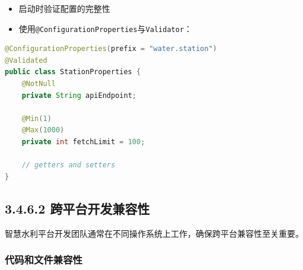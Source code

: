 \begin{enumerate}
  \begin{itemize}
  \tightlist
  \item
    启动时验证配置的完整性
  \item
    使用\passthrough{\lstinline!@ConfigurationProperties!}与\passthrough{\lstinline!Validator!}：
  \end{itemize}

\begin{lstlisting}[language=Java]
@ConfigurationProperties(prefix = "water.station")
@Validated
public class StationProperties {
    @NotNull
    private String apiEndpoint;

    @Min(1)
    @Max(1000)
    private int fetchLimit = 100;

    // getters and setters
}
\end{lstlisting}
\end{enumerate}

\subsection{3.4.6.2
跨平台开发兼容性}\label{ux8de8ux5e73ux53f0ux5f00ux53d1ux517cux5bb9ux6027}

智慧水利平台开发团队通常在不同操作系统上工作，确保跨平台兼容性至关重要。

\subsubsection{代码和文件兼容性}\label{ux4ee3ux7801ux548cux6587ux4ef6ux517cux5bb9ux6027}

